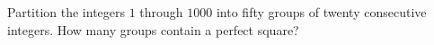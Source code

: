 Partition the integers $1$ through $1000$ into fifty groups of twenty consecutive integers. How many groups contain a perfect square?

